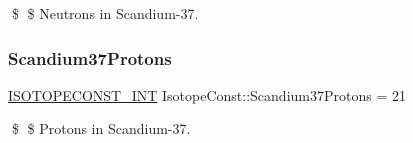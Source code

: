 \$ \$ Neutrons in Scandium-\/37. \mbox{\label{group___isotope_const-_scandium-_sc37_ga5d2370966fe210866e46ecfaac3f0d3f}} 
\subsubsection{\texorpdfstring{Scandium37\+Protons}{Scandium37Protons}}
{\footnotesize\ttfamily \mbox{\hyperlink{group___isotope_const-_macros_ga5f18360b3e99483a35c32d789e62621c}{I\+S\+O\+T\+O\+P\+E\+C\+O\+N\+S\+T\+\_\+\+I\+NT}} Isotope\+Const\+::\+Scandium37\+Protons = 21}

\$ \$ Protons in Scandium-\/37. 